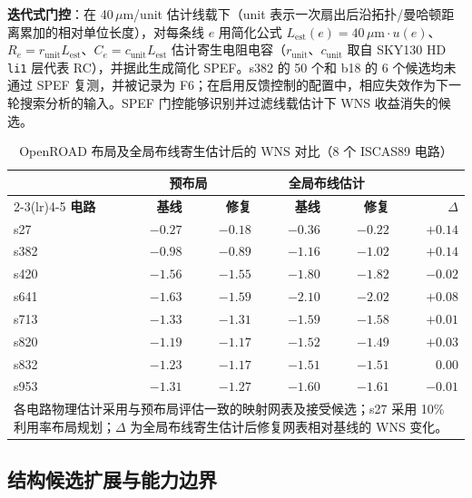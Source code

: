 \documentclass[twocolumn,10pt,fontset=windows]{ctexart}
\begin{document}
\textbf{迭代式门控}：在 40\,$\mu$m/unit 估计线载下（unit 表示一次扇出后沿拓扑/曼哈顿距离累加的相对单位长度），对每条线 $e$ 用简化公式 $L_{\mathrm{est}}(e)=40\,\mu\mathrm{m} \cdot u(e)$、$R_e=r_{\mathrm{unit}}L_{\mathrm{est}}$、$C_e=c_{\mathrm{unit}}L_{\mathrm{est}}$ 估计寄生电阻电容（$r_{\mathrm{unit}}$、$c_{\mathrm{unit}}$ 取自 SKY130 HD \texttt{li1} 层代表 RC），并据此生成简化 SPEF。s382 的 50 个和 b18 的 6 个候选均未通过 SPEF 复测，并被记录为 F6；在启用反馈控制的配置中，相应失效作为下一轮搜索分析的输入。SPEF 门控能够识别并过滤线载估计下 WNS 收益消失的候选。


\begin{table}[ht]
\centering
\caption{OpenROAD 布局及全局布线寄生估计后的 WNS 对比（8 个 ISCAS89 电路）}
\label{tab:pr8}
\footnotesize
\setlength{\tabcolsep}{2pt}
\begin{tabular}{lrrrrr}
\toprule
 & \multicolumn{2}{c}{\textbf{预布局}} & \multicolumn{2}{c}{\textbf{全局布线估计}} & \\
\cmidrule(lr){2-3}\cmidrule(lr){4-5}
\textbf{电路} & \textbf{基线} & \textbf{修复} & \textbf{基线} & \textbf{修复} & $\Delta$ \\
\midrule
s27  & $-0.27$ & $-0.18$ & $-0.36$ & $-0.22$ & $+0.14$ \\
s382 & $-0.98$ & $-0.89$ & $-1.16$ & $-1.02$ & $+0.14$ \\
s420 & $-1.56$ & $-1.55$ & $-1.80$ & $-1.82$ & $-0.02$ \\
s641 & $-1.63$ & $-1.59$ & $-2.10$ & $-2.02$ & $+0.08$ \\
s713 & $-1.33$ & $-1.31$ & $-1.59$ & $-1.58$ & $+0.01$ \\
s820 & $-1.19$ & $-1.17$ & $-1.52$ & $-1.49$ & $+0.03$ \\
s832 & $-1.23$ & $-1.17$ & $-1.51$ & $-1.51$ & $0.00$ \\
s953 & $-1.31$ & $-1.27$ & $-1.60$ & $-1.61$ & $-0.01$ \\
\bottomrule
\multicolumn{6}{p{0.92\columnwidth}}{\footnotesize 各电路物理估计采用与预布局评估一致的映射网表及接受候选；s27 采用 10\% 利用率布局规划；$\Delta$ 为全局布线寄生估计后修复网表相对基线的 WNS 变化。}\\
\end{tabular}
\end{table}

\subsection{结构候选扩展与能力边界}\label{sec:s_boundary}
\end{document}
